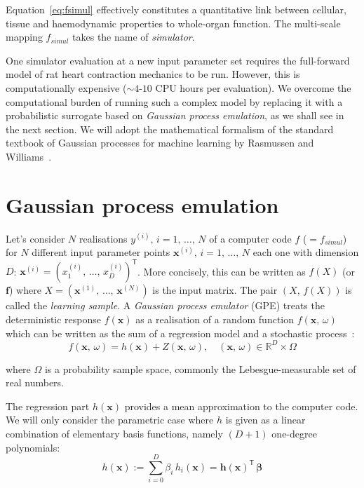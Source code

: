 \noindent
Equation~\eqref{eq:fsimul} effectively constitutes a quantitative link between cellular, tissue and haemodynamic properties to whole-organ function. The multi-scale mapping $f_{simul}$ takes the name of \textit{simulator}.

\vspace{0.2cm}
One simulator evaluation at a new input parameter set requires the full-forward model of rat heart contraction mechanics to be run. However, this is computationally expensive ($\sim 4$-$10$ CPU hours per evaluation). We overcome the computational burden of running such a complex model by replacing it with a probabilistic surrogate based on \textit{Gaussian process emulation}, as we shall see in the next section. We will adopt the mathematical formalism of the standard textbook of Gaussian processes for machine learning by Rasmussen and Williams~\cite{Rasmussen:2006}.


%
%
%
\section{Gaussian process emulation}\label{sec:ch3gaussianprocessemulation}
Let's consider $N$ realisations $y^{(i)},\,i=1,\,\dots,\,N$ of a computer code $f$ ($=f_{simul}$) for $N$ different input parameter points $\mathbf{x}^{(i)},\,i=1,\,\dots,\,N$ each one with dimension $D$: $\mathbf{x}^{(i)}=(x_{1}^{(i)},\,\dots,\,x_{D}^{(i)})^\mathsf{T}$. More concisely, this can be written as $f(X)$ (or $\mathbf{f}$) where $X=(\mathbf{x}^{(1)},\,\dots,\,\mathbf{x}^{(N)})$ is the input matrix. The pair $(X,\,f(X))$ is called the \textit{learning sample}. A \textit{Gaussian process emulator} (\acs{GPE}) treats the deterministic response $f(\mathbf{x})$ as a realisation of a random function $f(\mathbf{x},\,\omega)$ which can be written as the sum of a regression model and a stochastic process~\cite{OHagan:2006}:
\begin{equation}
    f(\mathbf{x},\,\omega) = h(\mathbf{x}) + Z(\mathbf{x},\,\omega), \quad (\mathbf{x},\,\omega)\in\mathbb{R}^D\times\Omega
\end{equation}

\noindent
where $\Omega$ is a probability sample space, commonly the Lebesgue-measurable set of real numbers.

\vspace{0.2cm}
The regression part $h(\mathbf{x})$ provides a mean approximation to the computer code. We will only consider the parametric case where $h$ is given as a linear combination of elementary basis functions, namely $(D+1)$ one-degree polynomials:
%
\begin{equation}
    h(\mathbf{x}):=\sum_{i=0}^D\beta_i\,h_i(\mathbf{x}) = \mathbf{h}(\mathbf{x})^\mathsf{T}\,\boldsymbol{\beta}
\end{equation}

